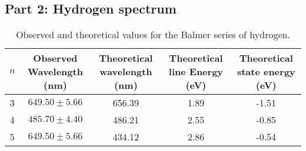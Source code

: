 
\subsection{Part 2: Hydrogen spectrum}

\begin{table}[h]
    \centering
    \begin{tabular}{|c|c|c|c|c|}
        \hline
        $n$ & Observed Wavelength (nm) & Theoretical wavelength (nm) & Theoretical line Energy (eV) & Theoretical state energy (eV) \\
        \hline
        3   & $649.50 \pm 5.66$        & 656.39                      & 1.89                         & -1.51                         \\
        4   & $485.70 \pm 4.40$        & 486.21                      & 2.55                         & -0.85                         \\
        5   & $649.50 \pm 5.66$        & 434.12                      & 2.86                         & -0.54                         \\
        \hline
    \end{tabular}
    \caption{Observed and theoretical values for the Balmer series of hydrogen.}
    \label{tab:my_label}
\end{table}